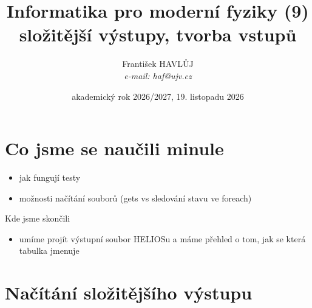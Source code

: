 \documentclass{beamer}
\title[IMF (9)]{Informatika pro moderní fyziky (9)\\složitější výstupy, tvorba vstupů}
\author[Franti\v{s}ek HAVL\r{U}J, ORF ÚJV Řež]{Franti\v{s}ek HAVL\r{U}J\\{\scriptsize \emph{e-mail: haf@ujv.cz}}}
\date{akademický rok 2026/2027, 19. listopadu 2026}
\institute[ORF ÚJV Řež]
{ÚJV Řež\\oddělení Reaktorové fyziky a podpory palivového cyklu}
\begin{document}
\begin{frame}
  \titlepage
\end{frame}

\begin{frame}
  \tableofcontents
\end{frame}

\section{Co jsme se naučili minule}

\begin{frame}{}
  \begin{itemize}
    \item jak fungují testy
    \item možnosti načítání souborů (gets vs sledování stavu ve foreach) 
  \end{itemize}
\end{frame}

\begin{frame}{Kde jsme skončili}
  \begin{itemize}
    \item umíme projít výstupní soubor HELIOSu a máme přehled o tom, jak se která tabulka jmenuje
  \end{itemize}
\end{frame}

\section{Načítání složitějšího výstupu}
\end{document}
